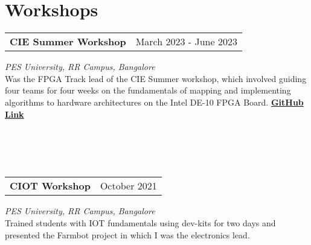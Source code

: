 \section{\sc Workshops}

\begin{tabular}{@{}p{4in}p{2in}}
  {\bf{CIE Summer Workshop}}  & March 2023 - June 2023   \\                  
\end{tabular}                                                                                                                                    
\textit{PES University, RR Campus, Bangalore} \\
Was the FPGA Track lead of the CIE Summer workshop, which involved guiding four teams for four weeks on the fundamentals of mapping and implementing algorithms to hardware architectures on the Intel DE-10 FPGA Board. \href{https://github.com/CIE-PESU/DE10_FPGA}{{\bf{GitHub Link}}}
\\
\\
\\ %
\\
\\
\begin{tabular}{@{}p{4in}p{2in}}
  {\bf{CIOT Workshop}}  & October 2021                           
\end{tabular}                 
\textit{PES University, RR Campus, Bangalore} \\
Trained students with IOT fundamentals using dev-kits for two days and presented the Farmbot project in which I was the electronics lead.    
\endinput

